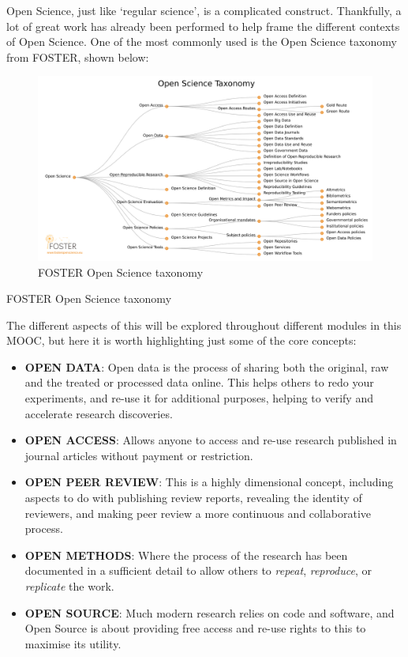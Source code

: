 \documentclass[]{book}
\begin{document}
{{{Open Science, just like `regular science', is a complicated construct. Thankfully, a lot of great work has already been performed to help frame the different contexts of Open Science. One of the most commonly used is the Open Science taxonomy from FOSTER, shown below:

\begin{figure}
\centering
\includegraphics{images/os_taxonomy.png}
\caption{FOSTER Open Science taxonomy}
\end{figure}

FOSTER Open Science taxonomy

The different aspects of this will be explored throughout different modules in this MOOC, but here it is worth highlighting just some of the core concepts:

\begin{itemize}
\item
  \textbf{OPEN DATA}: Open data is the process of sharing both the original, raw and the treated or processed data online. This helps others to redo your experiments, and re-use it for additional purposes, helping to verify and accelerate research discoveries.
\item
  \textbf{OPEN ACCESS}: Allows anyone to access and re-use research published in journal articles without payment or restriction.
\item
  \textbf{OPEN PEER REVIEW}: This is a highly dimensional concept, including aspects to do with publishing review reports, revealing the identity of reviewers, and making peer review a more continuous and collaborative process.
\item
  \textbf{OPEN METHODS}: Where the process of the research has been documented in a sufficient detail to allow others to \emph{repeat}, \emph{reproduce}, or \emph{replicate} the work.
\item
  \textbf{OPEN SOURCE}: Much modern research relies on code and software, and Open Source is about providing free access and re-use rights to this to maximise its utility.
\end{itemize}

}}}
\end{document}
